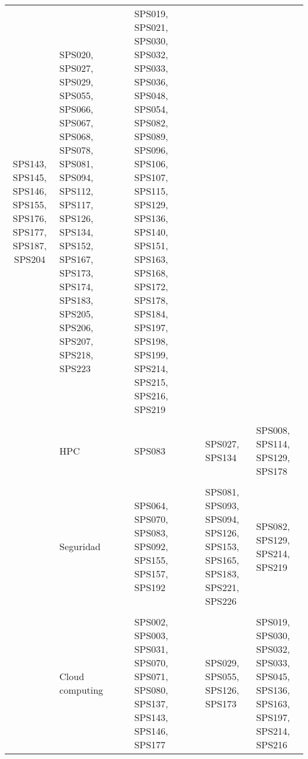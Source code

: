 \begin{longtable}{c Z Y Y Y}
SPS143, SPS145, SPS146, SPS155, SPS176, SPS177, SPS187, SPS204 & SPS020, SPS027, SPS029, SPS055, SPS066, SPS067, SPS068, SPS078, SPS081, SPS094, SPS112, SPS117, SPS126, SPS134, SPS152, SPS167, SPS173, SPS174, SPS183, SPS205, SPS206, SPS207, SPS218, SPS223 & SPS019, SPS021, SPS030, SPS032, SPS033, SPS036, SPS048, SPS054, SPS082, SPS089, SPS096, SPS106, SPS107, SPS115, SPS129, SPS136, SPS140, SPS151, SPS163, SPS168, SPS172, SPS178, SPS184, SPS197, SPS198, SPS199, SPS214, SPS215, SPS216, SPS219 \\\\ & HPC & SPS083 & SPS027, SPS134 & SPS008, SPS114, SPS129, SPS178 \\\\ & Seguridad & SPS064, SPS070, SPS083, SPS092, SPS155, SPS157, SPS192 & SPS081, SPS093, SPS094, SPS126, SPS153, SPS165, SPS183, SPS221, SPS226 & SPS082, SPS129, SPS214, SPS219 \\\\ & Cloud computing & SPS002, SPS003, SPS031, SPS070, SPS071, SPS080, SPS137, SPS143, SPS146, SPS177 & SPS029, SPS055, SPS126, SPS173 & SPS019, SPS030, SPS032, SPS033, SPS045, SPS136, SPS163, SPS197, SPS214, SPS216 \\ \bottomrule
\end{longtable}
\mbox{}\\




